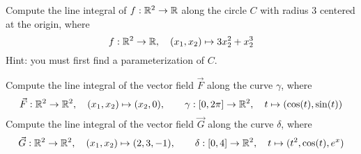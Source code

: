 \documentclass[11pt]{article}
\begin{document}
\begin{exercise}
    Compute the line integral of $f : \mathbb{R}^2 \rightarrow \mathbb{R}$ 
    along the circle $C$ with radius $3$ centered at the origin, where 
    \[
        f : \mathbb{R}^2 \to \mathbb{R}, \quad (x_1,x_2) \mapsto 3 x_2^2 + x_2^3
    \]
    Hint: you must first find a parameterization of $C$. 
\end{exercise}
\begin{solution}     
\end{solution}

\begin{exercise}
    Compute the line integral of the vector field $\vec{F}$ along the curve $\gamma$, where 
    \[
        \vec F : \mathbb{R}^2 \to \mathbb{R}^2, \quad (x_1,x_2) \mapsto ( x_2, 0 ), \qquad \gamma : [0,2\pi]  \to \mathbb{R}^2, \quad t \mapsto ( \cos(t), \sin(t) )
    \]
    Compute the line integral of the vector field $\vec{G}$ along the curve $\delta$, where 
    \[
        \vec G : \mathbb{R}^2 \to \mathbb{R}^2, \quad (x_1,x_2) \mapsto ( 2, 3, -1 ), \qquad \delta : [0,4]  \to \mathbb{R}^2, \quad t \mapsto  ( t^2, \cos(t), e^x )
    \]
\end{exercise}
\begin{solution}
\end{solution}
\end{document}
